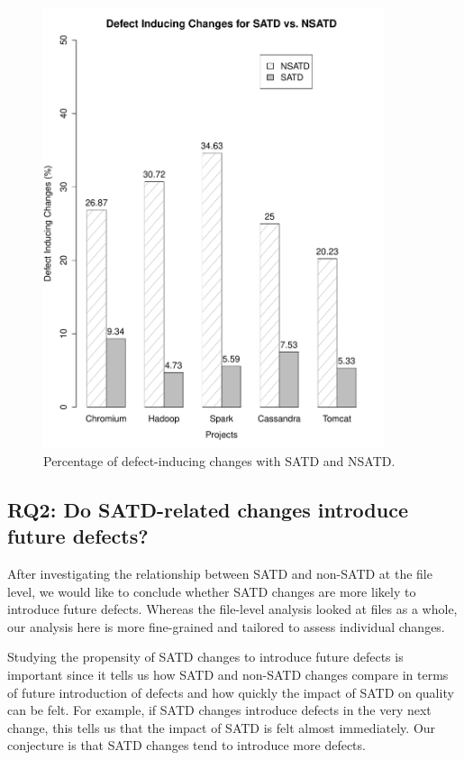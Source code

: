 \begin{figure}[tb!]
	\centering
	\includegraphics[width=100mm]{figures/chapter3/bug_inducing_changes}
	\caption{Percentage of defect-inducing changes with SATD and NSATD.}
	\label{figure:bug_inducing_changes}
\end{figure}

\subsection*{RQ2: Do SATD-related changes introduce future defects?}

 After investigating the relationship between SATD and non-SATD at the file level, we would like to conclude whether SATD changes are more likely to introduce future defects. Whereas the file-level analysis looked at files as a whole, our analysis here is more fine-grained and tailored to assess individual changes.

Studying the propensity of SATD changes to introduce future defects is important since it tells us how SATD and non-SATD changes compare in terms of future introduction of defects and how quickly the impact of SATD on quality can be felt. For example, if SATD changes introduce defects in the very next change, this tells us that the impact of SATD is felt almost immediately. Our conjecture is that SATD changes tend to introduce more defects.


